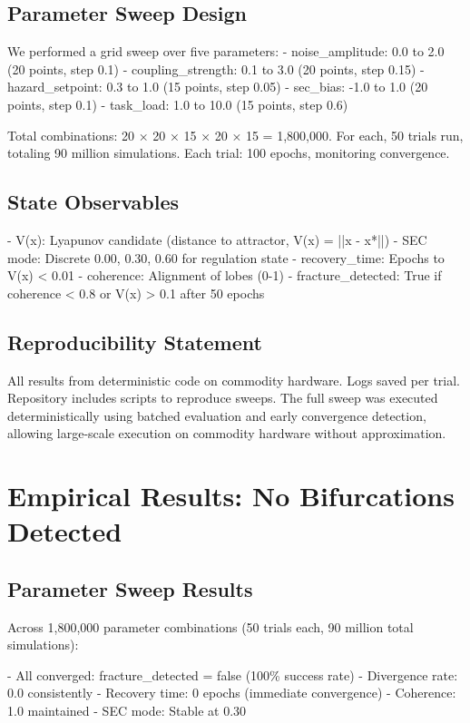 \documentclass[11pt,a4paper]{article}
\begin{document}
\subsection{Parameter Sweep Design}

We performed a grid sweep over five parameters:
- noise_amplitude: 0.0 to 2.0 (20 points, step 0.1)
- coupling_strength: 0.1 to 3.0 (20 points, step 0.15)  
- hazard_setpoint: 0.3 to 1.0 (15 points, step 0.05)
- sec_bias: -1.0 to 1.0 (20 points, step 0.1)
- task_load: 1.0 to 10.0 (15 points, step 0.6)

Total combinations: 20 × 20 × 15 × 20 × 15 = 1,800,000. For each, 50 trials run, totaling 90 million simulations. Each trial: 100 epochs, monitoring convergence.

\subsection{State Observables}

- V(x): Lyapunov candidate (distance to attractor, V(x) = ||x - x*||)
- SEC mode: Discrete {0.00, 0.30, 0.60} for regulation state
- recovery_time: Epochs to V(x) < 0.01
- coherence: Alignment of lobes (0-1)
- fracture_detected: True if coherence < 0.8 or V(x) > 0.1 after 50 epochs

\subsection{Reproducibility Statement}

All results from deterministic code on commodity hardware. Logs saved per trial. Repository includes scripts to reproduce sweeps. The full sweep was executed deterministically using batched evaluation and early convergence detection, allowing large-scale execution on commodity hardware without approximation.

\section{Empirical Results: No Bifurcations Detected}

\subsection{Parameter Sweep Results}

Across 1,800,000 parameter combinations (50 trials each, 90 million total simulations):

- All converged: fracture_detected = false (100\% success rate)
- Divergence rate: 0.0 consistently
- Recovery time: 0 epochs (immediate convergence)
- Coherence: 1.0 maintained
- SEC mode: Stable at 0.30
\end{document}
